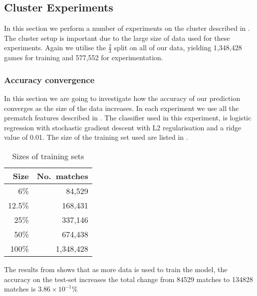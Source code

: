 \subsection{Cluster Experiments}\label{sec:clustertest}
In this section we perform a number of experiments on the cluster described in . The cluster setup is important due to the large size of data used for these experiments. Again we utilise the $\frac{2}{3}$ split on all of our data, yielding 1,348,428 games for training and 577,552 for experimentation.

\subsubsection{Accuracy convergence}
In this section we are going to investigate how the accuracy of our prediction converges as the size of the data increases. In each experiment we use all the prematch features described in . The classifier used in this experiment, is logistic regression with stochastic gradient descent with L2 regularisation and a ridge value of 0.01. The size of the training set used are listed in .

\begin{table}[!htb]
  \centering
  \begin{tabular}{|r|r|}
    \hline
    Size   & No.\ matches \\\hline
    6\%    & 84,529\\
    12.5\% & 168,431\\  
    25\%   & 337,146\\  
    50\%   & 674,438\\ 
    100\%  & 1,348,428\\\hline
  \end{tabular}
  \caption{Sizes of training sets}\label{tab:trainingsize}
\end{table}

The results from  shows that as more data is used to train the model, the accuracy on the test-set increases the total change from 84529 matches to 134828 matches is $3.86\times10^{-1}\%$

